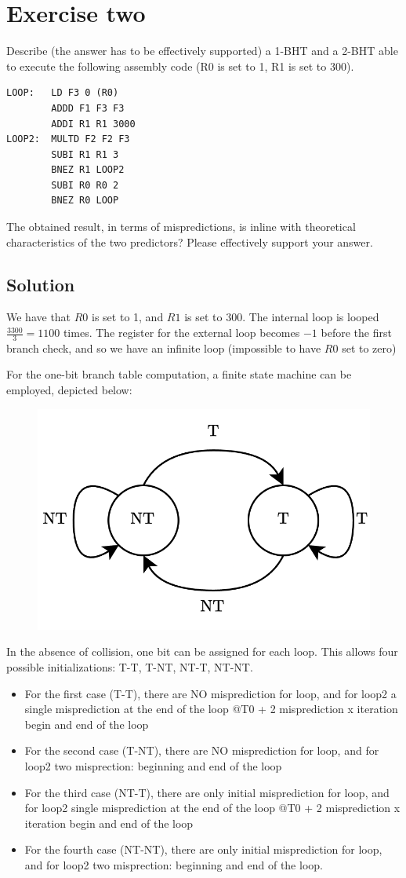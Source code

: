 \section{Exercise two}

Describe (the answer has to be effectively supported) a 1-BHT and a 2-BHT able to execute the following assembly code (R0 is set to 1, R1 is set to 300). 
\begin{verbatim}
LOOP:   LD F3 0 (R0)
        ADDD F1 F3 F3
        ADDI R1 R1 3000
LOOP2:  MULTD F2 F2 F3
        SUBI R1 R1 3
        BNEZ R1 LOOP2
        SUBI R0 R0 2
        BNEZ R0 LOOP
\end{verbatim}
The obtained result, in terms of mispredictions, is inline with theoretical characteristics of the two predictors? 
Please effectively support your answer.

\subsection*{Solution}
We have that $R0$ is set to 1, and $R1$ is set to 300. 
The internal loop is looped $\frac{3300}{3}=1100$ times. 
The register for the external loop becomes $-1$ before the first branch check, and so we have an infinite loop (impossible to have $R0$ set to zero)

For the one-bit branch table computation, a finite state machine can be employed, depicted below:
\begin{figure}[H]
    \centering
    \includegraphics[width=0.4\linewidth]{images/1bht.png}
\end{figure}

In the absence of collision, one bit can be assigned for each loop. 
This allows four possible initializations: T-T, T-NT, NT-T, NT-NT.
\begin{itemize}
    \item For the first case (T-T), there are NO misprediction for loop, and for loop2 a single misprediction at the end of the loop @T0 + 2 misprediction x iteration begin and end of the loop
    \item For the second case (T-NT), there are NO misprediction for loop, and for loop2 two misprection: beginning and end of the loop
    \item For the third case (NT-T), there are only initial misprediction for loop, and for loop2 single misprediction at the end of the loop @T0 + 2 misprediction x iteration begin and end of the loop
    \item For the fourth case (NT-NT), there are only initial misprediction for loop, and for loop2 two misprection: beginning and end of the loop. 
\end{itemize}

